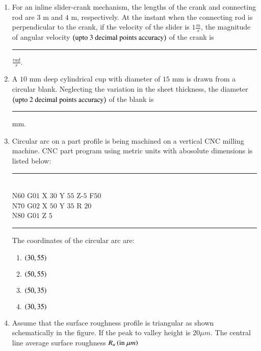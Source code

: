 \documentclass[journal]{IEEEtran}
\begin{document}
\begin{enumerate}
{\begin{figure}[H]
\label{fig:my_label}
\end{figure}
\begin{multicols}{4}
\begin{enumerate}
\item $\sqrt{\frac{5k}{m}}$
\item $\sqrt{\frac{5k}{2m}}$
\item $\sqrt{\frac{3k}{2m}}$
\item $\sqrt{\frac{3k}{m}}$
\end{enumerate}
\end{multicols}
}
\item{
For an inline slider-crank mechanism, the lengths of the crank and connecting rod are $3$ m and $4$ m, respectively. At the instant when the connecting rod is perpendicular to the crank, if the velocity of the slider is $1\frac{m}{s}$, the magnitude of angular velocity $\left(\text{upto 3 decimal points accuracy}\right)$ of the crank is \rule{2cm}{0.15mm}$\frac{rad}{s}$.\\
}
\item{
A $10$ mm deep cylindrical cup with diameter of $15$ mm is drawn from a circular blank. Neglecting the variation in the sheet thickness, the diameter $\left(\text{upto 2 decimal points accuracy}\right)$ of the blank is \rule{2cm}{0.15mm}mm.\\
}
\item{
Circular arc on a part profile is being machined on a vertical CNC milling machine. CNC part program using metric units with abosolute dimensions is listed below:
\rule{5cm}{0.15mm}\\
N$60$ G$01$ X $30$ Y $55$ Z-$5$ F$50$\\
N$70$ G$02$ X $50$ Y $35$ R $20$\\
N$80$ G$01$ Z $5$\\
\rule{5cm}{0.15mm}
The coordinates of the circular arc are:
\begin{multicols}{4}
    \begin{enumerate}
        \item $\left(30,55\right)$
        \item $\left(50,55\right)$
        \item $\left(50,35\right)$
        \item $\left(30,35\right) $
    \end{enumerate}
\end{multicols}
}
\item{
Assume that the surface roughness profile is triangular as shown schematically in the figure. If the peak to valley height is $20\mu m$. The central line average surface roughness $R_a\left(\text{in }\mu m\right)$
\begin{figure}[H]
\centering
{}%


\end{figure}}
\end{enumerate}
\end{document}
